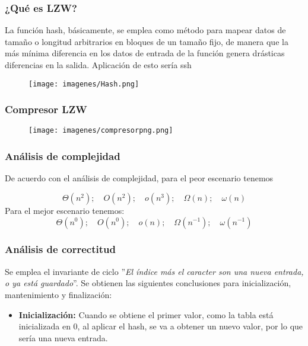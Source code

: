 \documentclass{beamer}
\begin{document}

	\begin{frame}
		\frametitle{¿Qué es LZW?}
		La función hash, básicamente, se emplea como método para mapear datos de tamaño o longitud arbitrarios en bloques de un tamaño fijo, de manera que la más mínima diferencia en los datos de entrada de la función genera drásticas diferencias en la salida. Aplicación de esto sería ssh
		\begin{figure}
			\texttt{[image: imagenes/Hash.png]}
		\end{figure}

	\end{frame}


	\begin{frame}
		\frametitle{Compresor LZW}

		\begin{figure}
			\texttt{[image: imagenes/compresorpng.png]}
		\end{figure}

	\end{frame}
	\begin{frame}
		\frametitle{Análisis de complejidad}
		De acuerdo con el análisis de complejidad, para el peor escenario tenemos
		
		\begin{equation}
			\Theta\left(n^2 \right);\quad O\left(n^2 \right);\quad o\left(n^3 \right);\quad \Omega\left(n \right);\quad\omega\left(n \right)
		\end{equation}
		Para el mejor escenario tenemos:
		\begin{equation}
			\Theta\left(n^0 \right);\quad O\left(n^0 \right);\quad o\left(n \right);\quad \Omega\left(n^{-1} \right);\quad\omega\left(n^{-1} \right)
		\end{equation}

	\end{frame}
	\begin{frame}
		\frametitle{Análisis de correctitud}
		Se emplea el invariante de ciclo ''\textit{El índice más el caracter son una nueva entrada, o ya está guardado}''. Se obtienen las siguientes conclusiones para inicialización, mantenimiento y finalización:
		
		\begin{itemize}
			\item \textbf{Inicialización:} Cuando se obtiene el primer valor, como la tabla está inicializada en 0, al aplicar el hash, se va a obtener un nuevo valor, por lo que sería una nueva entrada.			
		\end{itemize}				
		
	\end{frame}
	
\end{document}

